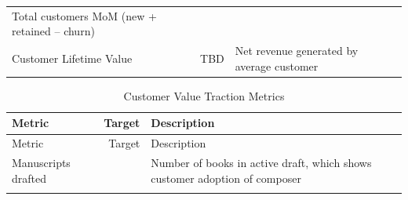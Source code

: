 \documentclass[11pt,openany]{book}
\begin{document}
\begin{longtable}[]{@{}lrl@{}}
\begin{minipage}[t]{0.48\columnwidth}
Total customers MoM (new + retained -- churn)\strut
\end{minipage}\tabularnewline
\begin{minipage}[t]{0.35\columnwidth}\raggedright
Customer Lifetime Value\strut
\end{minipage} & \begin{minipage}[t]{0.08\columnwidth}\raggedleft
TBD\strut
\end{minipage} & \begin{minipage}[t]{0.48\columnwidth}\raggedright
Net revenue generated by average customer\strut
\end{minipage}\tabularnewline
\bottomrule
\end{longtable}

\newpage{}

\begin{longtable}[]{@{}lrl@{}}
\caption{Customer Value Traction Metrics}\tabularnewline
\toprule
\begin{minipage}[b]{0.35\columnwidth}\raggedright
Metric\strut
\end{minipage} & \begin{minipage}[b]{0.08\columnwidth}\raggedleft
Target\strut
\end{minipage} & \begin{minipage}[b]{0.48\columnwidth}\raggedright
Description\strut
\end{minipage}\tabularnewline
\midrule
\endfirsthead
\toprule
\begin{minipage}[b]{0.35\columnwidth}\raggedright
Metric\strut
\end{minipage} & \begin{minipage}[b]{0.08\columnwidth}\raggedleft
Target\strut
\end{minipage} & \begin{minipage}[b]{0.48\columnwidth}\raggedright
Description\strut
\end{minipage}\tabularnewline
\midrule
\endhead
\begin{minipage}[t]{0.35\columnwidth}\raggedright
Manuscripts drafted\strut
\end{minipage} & \begin{minipage}[t]{0.08\columnwidth}\raggedleft
750\strut
\end{minipage} & \begin{minipage}[t]{0.48\columnwidth}\raggedright
Number of books in active draft, which shows customer adoption of
composer\strut
\end{minipage}\tabularnewline
\begin{minipage}[t]{0.35\columnwidth}\raggedright

\end{minipage}
\end{longtable}
\end{document}

